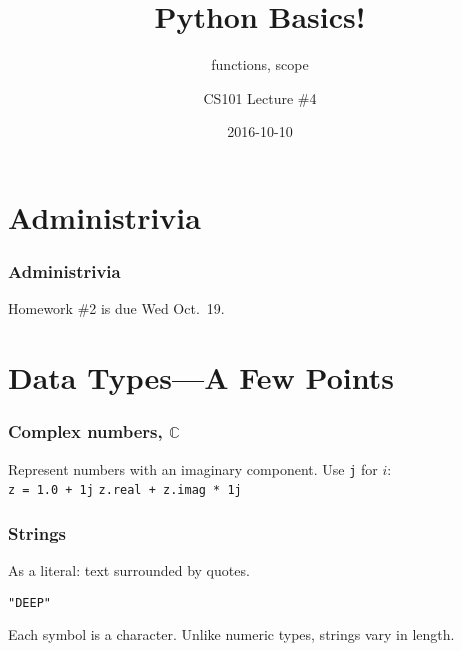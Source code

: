 \documentclass[11pt]{beamer}
\title{Python Basics!}
\subtitle{functions, scope}
\author{CS101 Lecture \#4}
\date{2016-10-10}
\begin{document}
  \setcounter{showProgressBar}{0}
  \setcounter{showSlideNumbers}{0}

\frame{\titlepage}

\setcounter{framenumber}{0}
\setcounter{showProgressBar}{1}
\setcounter{showSlideNumbers}{1}

\section{Administrivia}

\begin{frame}
  \frametitle{Administrivia}
  \Enlarge
  \begin{itemize}
  \myitem  Homework \#2 is due Wed Oct.\ 19. 
  \end{itemize}
\end{frame}

\section{Data Types---A Few Points}

\begin{frame}
  \frametitle{Complex numbers, $\mathbb{C}$}
  \Enlarge

  \begin{itemize}
  \myitem  Represent numbers with an imaginary component.
  \myitem  Use \texttt{j} for $i$: \\
    \textcolor{CS101GradBot}{\texttt{z = 1.0 + 1j}} \pause
  \myitem  \texttt{z.real + z.imag * 1j}
  \end{itemize}
\end{frame}

\begin{frame}
  \frametitle{Strings}
  \Enlarge

  \begin{itemize}
  \myitem  As a literal:  text surrounded by quotes.
    \begin{itemize}
    \mysubitem  \texttt{"DEEP"}
    \end{itemize}
  \myitem  Each symbol is a character.
  \myitem  Unlike numeric types, strings vary in length.
  \end{itemize}
\end{frame}
\end{document}
